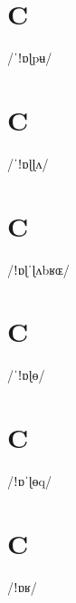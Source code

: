 \documentclass[10pt,a4paper,twoside]{book}
\begin{document}
\section*{C}

\begin{multicols}{3}
 {/ˈǃɒɭpʉ/} {}
\end{multicols}

\section*{C}

\begin{multicols}{3}
 {/ˈǃɒɭɭʌ/} {}
\end{multicols}

\section*{C}

\begin{multicols}{3}
 {/ǃɒɭˈɭʌbʁɶ/} {}
\end{multicols}

\section*{C}

\begin{multicols}{3}
 {/ˈǃɒɭɵ/} {}
\end{multicols}

\section*{C}

\begin{multicols}{3}
 {/ǃɒˈɭɵq/} {}
\end{multicols}

\section*{C}

\begin{multicols}{3}
 {/ǃɒʁ/} {}
\end{multicols}
\end{document}
